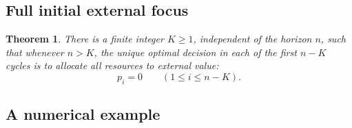 \documentclass[11pt]{article}
\newtheorem{theorem}{Theorem}
\begin{document}
\subsection*{Full initial external focus}

\begin{theorem}
There is a finite integer $K\ge1$, independent of the horizon $n$, such that whenever $n>K$, the unique optimal decision in each of the first $n-K$ cycles is to allocate all resources to external value:
\[
 p_i=0\qquad(1\le i\le n-K).
\]
\end{theorem}

\subsection*{A numerical example}
\end{document}
